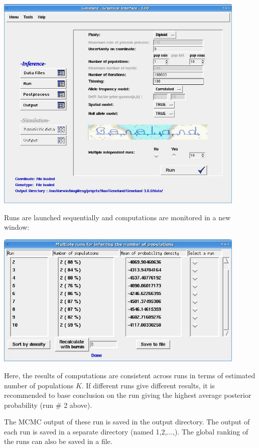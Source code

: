 \documentclass{article}
\begin{document}
\centerline{\includegraphics[width=12cm]{../inst/images/multip_run.jpg}}

\newpage
Runs are launched sequentially and computations are monitored in a new window:
\\
\bigskip

\centerline{\includegraphics[width=12cm]{../inst/images/multip_run2.jpg}}


\bigskip

Here, the results of computations are consistent across runs in terms of estimated number of populations $K$. 
If different runs give different results, it is recommended to base conclusion on the run giving the highest average posterior 
probability (run $\#$ 2 above).

The MCMC output of these run is saved in the output directory. The output of each run is saved in a separate directory (named 1,2,...,).
The global ranking of the runs can also be saved in a file. 
\end{document}
